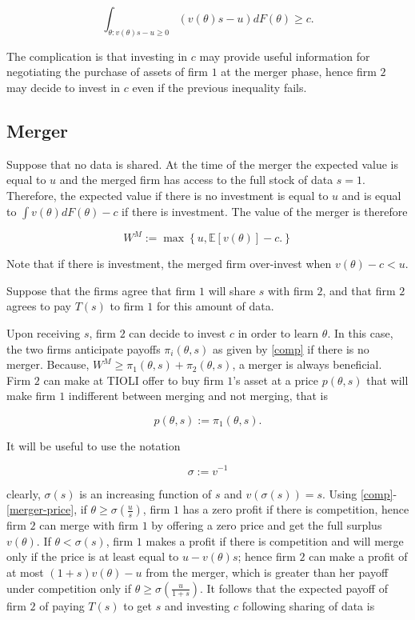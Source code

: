 \documentclass[a4paper,leqno]{article}%
\newcommand{\E}{\mathbb E}
\renewcommand{\t}{\theta}
\newcommand{\s}{\sigma}
\begin{document}
%

\[
\int_{\t:v(\t)s-u\geq 0}(v(\t)s-u) dF(\t)\geq c.
\]

The complication is that investing in $c$ may provide useful information for negotiating the purchase of assets of firm $1$ at the merger phase, hence firm $2$ may decide to invest in $c$ even if the previous inequality fails.



\subsection{Merger}

%

Suppose that no data is shared. At the time of the merger the expected value is equal to $u$ and the merged firm has access to the full stock of data $s=1$. Therefore, the expected value if there is no investment is equal to $u$ and is equal to $\int v(\t)dF(\t)-c$ if there is investment. The value of the merger is therefore

%

\[
W^M:=\max\left\{u,\E[v(\t)]-c.\right\}
\]

%

Note that if there is investment, the merged firm over-invest when $v(\t)-c<u$.



Suppose that the firms agree that firm $1$ will share $s$ with firm $2$, and that firm $2$ agrees to pay $T(s)$ to firm $1$ for this amount of data. 



Upon receiving $s$, firm $2$ can decide to invest $c$ in order to learn $\t$. In this case, the two firms anticipate payoffs $\pi_i(\t,s)$ as given by \eqref{comp} if there is no merger. Because, $W^M\geq \pi_1(\t,s)+\pi_2(\t,s)$, a merger is always beneficial. Firm $2$ can make at TIOLI offer to buy firm $1$'s asset at a price $p(\t,s)$ that will make firm $1$ indifferent between merging and not merging, that is 

%

\begin{equation}\label{merger-price}
    p(\t,s):=\pi_1(\t,s).  
\end{equation}

%

It will be useful to use the notation

%

\[
\s:=v^{-1}
\]

clearly, $\s(s)$ is an increasing function of $s$ and $v(\s(s))=s$. Using \eqref{comp}-\eqref{merger-price}, if $\t\geq \s(\frac{u}{s})$, firm $1$ has a zero profit if there is competition, hence firm $2$ can merge with firm $1$ by offering a zero price and get the full surplus $v(\t)$. If $\t< \s(s)$, firm $1$ makes a profit if there is competition and will merge only if the price is at least equal to $u-v(\t)s$; hence firm $2$ can make a profit of at most $(1+s)v(\t)-u$ from the merger, which is greater than her payoff under competition only if $\t\geq \s(\frac{u}{1+s})$. It follows that the expected payoff of firm $2$ of paying $T(s)$ to get $s$ and investing $c$ following sharing of data is 
\end{document}
